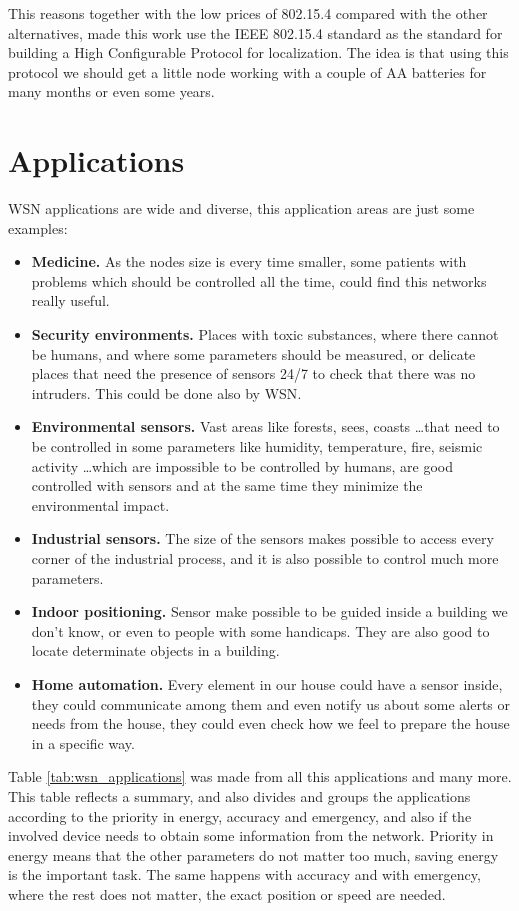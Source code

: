 This reasons together with the low prices of 802.15.4 compared with the other alternatives, made this work use the \ac{IEEE} 802.15.4 
standard as the standard for building a High Configurable Protocol for localization. The idea is that using this protocol we should
get a little node working with a couple of AA batteries for many months or even some years.

\section{Applications}

\ac{WSN} applications are wide and diverse, this application areas are just some examples:

\begin{itemize}
 \item \textbf{Medicine.} As the nodes size is every time smaller, some patients with problems which should be controlled all the time,
could find this networks really useful.
 \item \textbf{Security environments.} Places with toxic substances, where there cannot be humans, and where some parameters should be measured,
or delicate places that need the presence of sensors 24/7 to check that there was no intruders. This could be done also by \ac{WSN}.
 \item \textbf{Environmental sensors.} Vast areas like forests, sees, coasts \ldots that need to be controlled in some parameters like
humidity, temperature, fire, seismic activity \ldots which are impossible to be controlled by humans, are good controlled with sensors
and at the same time they minimize the environmental impact.
 \item \textbf{Industrial sensors.} The size of the sensors makes possible to access every corner of the industrial process, and it is also
possible to control much more parameters.
 \item \textbf{Indoor positioning.} Sensor make possible to be guided inside a building we don't know, or even to people with some handicaps.
They are also good to locate determinate objects in a building.
 \item \textbf{Home automation.} Every element in our house could have a sensor inside, they could communicate among them and even notify us
about some alerts or needs from the house, they could even check how we feel to prepare the house in a specific way.
\end{itemize}

Table \ref{tab:wsn_applications} was made from all this applications and many more. This table reflects a summary, and also divides and groups
the applications according to the priority in energy, accuracy and emergency, and also if the involved device needs to obtain some information
from the network. Priority in energy means that the other parameters do not matter too much, saving energy is the important task. 
The same happens with accuracy and with emergency, where the rest does not matter, the exact position or speed are needed.

